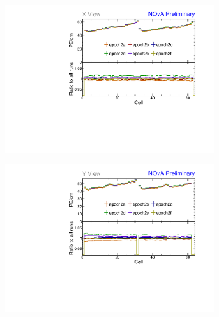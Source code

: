 \begin{figure}[!hbtp]
\begin{subfigure}[b]{0.495\textwidth}
\end{subfigure}
\begin{subfigure}[b]{0.495\textwidth}
\centering
\includegraphics[width=\textwidth]{Plots/TBCalibration/Attenprofs_P2Data_CellPE_X_Combined.pdf}
\end{subfigure}
\begin{subfigure}[b]{0.495\textwidth}
\centering
\includegraphics[width=\textwidth]{Plots/TBCalibration/Attenprofs_P2Data_CellPE_Y_Combined.pdf}
\end{subfigure}
\begin{subfigure}[b]{0.495\textwidth}
\centering

\end{subfigure}
\end{figure}
